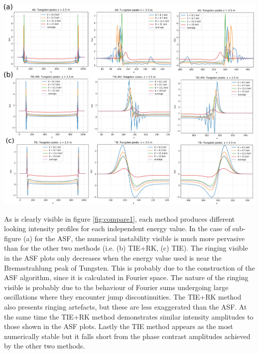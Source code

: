 \documentclass[10pt, a4paper, singlespacing]{report}
\newenvironment{Figure}
    {\par\medskip\noindent\minipage{\linewidth}}
    {\endminipage\par\medskip}
\begin{document}
\begin{Figure}\label{fig:compare1}  
 \centering
  \hspace*{-0.9cm}
 \includegraphics[width=1.1\linewidth]{AS_vs_TIE+RK_vs_TIE_1.pdf}
\end{Figure}
As is clearly visible in figure \ref{fig:compare1}, each method produces different looking intensity profiles for each independent energy value. In the case of sub-figure (a) for the ASF, the numerical instability visible is much more pervasive than for the other two methods (i.e. (b) TIE+RK, (c) TIE). The ringing visible in the ASF plots only decreases when the energy value used is near the Bremsstrahlung peak of Tungsten. This is probably due to the construction of the ASF algorithm, since it is calculated in Fourier space. The nature of the ringing visible is probably due to the behaviour of Fourier sums undergoing large oscillations where they encounter jump discontinuities. The TIE+RK method also presents  ringing artefacts, but these are less exaggerated than the ASF. At the same time the TIE+RK method demonstrates similar intensity amplitudes to those shown in the ASF plots. Lastly the TIE method appears as the most numerically stable but it falls short from the phase contrast amplitudes achieved by the other two methods.
\end{document}
